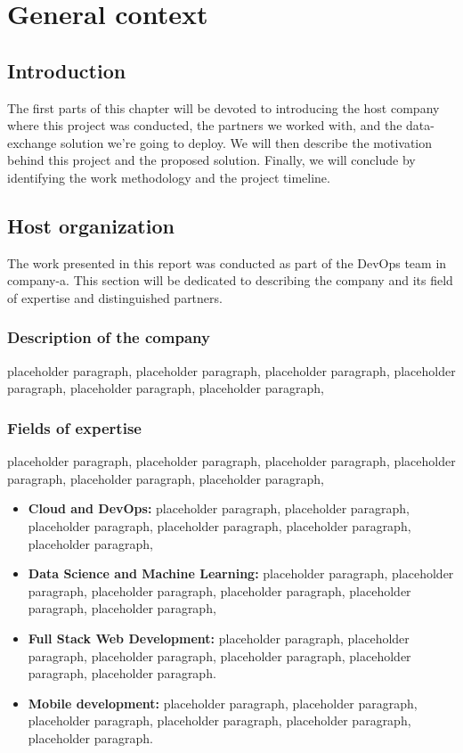 \chapter{General context}
\label{chap_1}
\section*{Introduction}
\label{section_intro}
\qquad The first parts of this chapter will be devoted to introducing the host company where this project was conducted, the partners we worked with, and the data-exchange solution we're going to deploy. We will then describe the motivation behind this project and the proposed solution. Finally, we will conclude by identifying the work methodology and the project timeline.

\newpage

\section{Host organization}
\qquad The work presented in this report was conducted as part of the DevOps team in company-a. This section will be dedicated to describing the company and its field of expertise and distinguished partners.

\subsection{Description of the company}
\qquad 
placeholder paragraph, placeholder paragraph, placeholder paragraph, placeholder paragraph, placeholder paragraph, placeholder paragraph,
\cite{company}

\subsection{Fields of expertise}
\qquad 

placeholder paragraph, placeholder paragraph, placeholder paragraph, placeholder paragraph, placeholder paragraph, placeholder paragraph,

\begin{itemize}[label=\textbullet]
    \item \textbf{Cloud and DevOps:} placeholder paragraph, placeholder paragraph, placeholder paragraph, placeholder paragraph, placeholder paragraph, placeholder paragraph,

    \item \textbf{Data Science and Machine Learning: } placeholder paragraph, placeholder paragraph, placeholder paragraph, placeholder paragraph, placeholder paragraph, placeholder paragraph,

    \item \textbf{Full Stack Web Development:} placeholder paragraph, placeholder paragraph, placeholder paragraph, placeholder paragraph, placeholder paragraph, placeholder paragraph.
 
    \item \textbf{Mobile development:} placeholder paragraph, placeholder paragraph, placeholder paragraph, placeholder paragraph, placeholder paragraph, placeholder paragraph.
\end{itemize}

